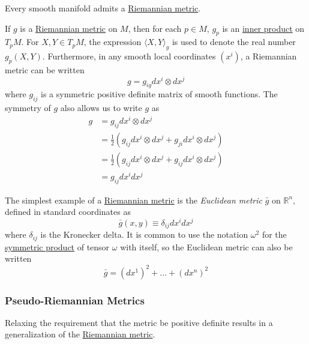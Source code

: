 \documentclass{article}
\newcounter{theorem}[section]
\newcounter{example}[section]
\begin{document}
    \begin{theorem}
      \label{thm:existence-of-riemannian-metrics}
    Every smooth manifold admits a \hyperref[def:riemannian-metric]{Riemannian metric}. 
    \end{theorem}

    If $g$ is a \hyperref[def:riemannian-metric]{Riemannian metric} on $M$, then for each $p \in M$, $g_p$ is an \hyperref[lin-def:inner-product]{inner product} on $T_p M$. For $X, Y \in T_p M$, the expression $\langle X, Y \rangle_g$ is used to denote the real number $g_p (X, Y)$. Furthermore, in any smooth local coordinates $(x^i)$, a Riemannian metric can be written 
    \begin{equation}
      g = g_{i g} dx^i \otimes dx^j
    \end{equation}
    where $g_{ij}$ is a symmetric positive definite matrix of smooth functions. The symmetry of $g$ also allows us to write $g$ as 
    \begin{align*}
        g & = g_{ij} dx^i \otimes dx^j \\
        & = \frac{1}{2} (g_{ij} dx^i \otimes dx^j + g_{ji} dx^i \otimes dx^j) \\
        & = \frac{1}{2} (g_{ij} dx^i \otimes dx^j + g_{ij} dx^i \otimes dx^j) \\
        & = g_{ij} dx^i dx^j 
    \end{align*}

    \begin{example}
      \label{ex:euclidean-metric}
    The simplest example of a \hyperref[def:riemannian-metric]{Riemannian metric} is the \textit{Euclidean metric} $\bar{g}$ on $\mathbb{R}^n$, defined in standard coordinates as 
    \begin{equation}
      \bar{g}(x, y) \equiv \delta_{ij} dx^i dx^j
    \end{equation}
    where $\delta_{ij}$ is the Kronecker delta. It is common to use the notation $\omega^2$ for the \hyperref[def:symmetric-product]{symmetric product} of tensor $\omega$ with itself, so the Euclidean metric can also be written 
    \begin{equation}
      \bar{g} = (dx^1)^2 + ... + (dx^n)^2
    \end{equation}
    \end{example}

    \subsubsection{Pseudo-Riemannian Metrics}
      Relaxing the requirement that the metric be positive definite results in a generalization of the \hyperref[def:riemannian-metric]{Riemannian  metric}. 
\end{document}
